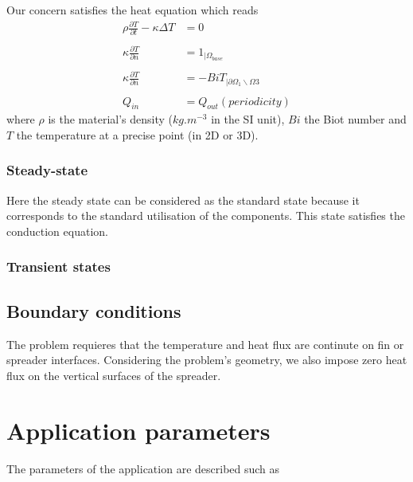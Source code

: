 Our concern satisfies the heat equation which reads 
\begin{equation}
   \begin{split}
      \displaystyle{\rho \frac{ \partial T}{\partial t}}  -  \kappa \Delta T & = 0 \\ \\
      \displaystyle{ \kappa \frac{\partial T}{\partial n}} & =  1_{| \varOmega_{base}} \\ \\
      \displaystyle{ \kappa \frac{\partial T}{\partial n}} & = - Bi T_{| \partial \varOmega_1 \backslash \varOmega3 } \\ \\
     Q_{in} & = Q_{out} (periodicity)
  \end{split}
\end{equation}
where $\rho$ is the material's density ($kg.m^{-3}$ in the SI unit), $Bi$ the Biot number and $T$ the temperature at a precise point (in 2D or 3D).

\subsubsection{Steady-state}
Here the steady state can be considered as the standard state because it corresponds to the standard utilisation of the components. This state satisfies the conduction equation.

\subsubsection{Transient states}


\subsection{Boundary conditions}
The problem requieres that the temperature and heat flux are continute on fin or spreader interfaces. Considering the problem's geometry, we also impose zero heat flux on the vertical surfaces of the spreader. 

\section{Application parameters}
\label{therm:param}

The parameters of the application are described such as 


